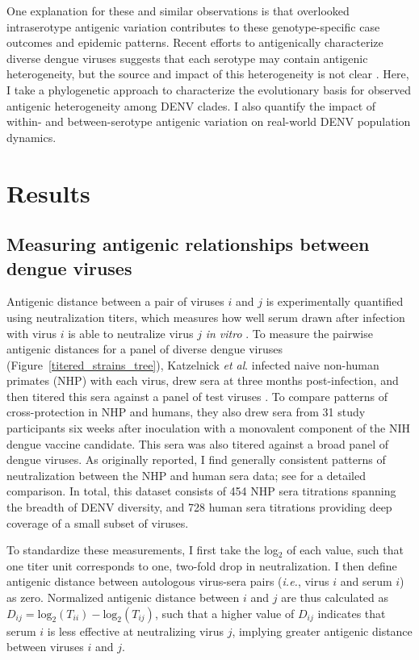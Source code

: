 One explanation for these and similar observations is that overlooked intraserotype antigenic variation contributes to these genotype-specific case outcomes and epidemic patterns.
Recent efforts to antigenically characterize diverse dengue viruses suggests that each serotype may contain antigenic heterogeneity, but the source and impact of this heterogeneity is not clear \citep{katzelnick2015dengue}.
Here, I take a phylogenetic approach to characterize the evolutionary basis for observed antigenic heterogeneity among DENV clades.
I also quantify the impact of within- and between-serotype antigenic variation on real-world DENV population dynamics.

\section{Results}
\subsection{Measuring antigenic relationships between dengue viruses}

Antigenic distance between a pair of viruses $i$ and $j$ is experimentally quantified using neutralization titers, which measures how well serum drawn after infection with virus $i$ is able to neutralize virus $j$ \textit{in vitro} \citep{russell1967dengue}.
To measure the pairwise antigenic distances for a panel of diverse dengue viruses (Figure~\ref{titered_strains_tree}), Katzelnick \textit{et al}. infected naive non-human primates (NHP) with each virus, drew sera at three months post-infection, and then titered this sera against a panel of test viruses \citep{katzelnick2015dengue}.
To compare patterns of cross-protection in NHP and humans, they also drew sera from 31 study participants six weeks after inoculation with a monovalent component of the NIH dengue vaccine candidate.
This sera was also titered against a broad panel of dengue viruses.
As originally reported, I find generally consistent patterns of neutralization between the NHP and human sera data; see \citep{katzelnick2015dengue} for a detailed comparison.
In total, this dataset consists of 454 NHP sera titrations spanning the breadth of DENV diversity, and 728 human sera titrations providing deep coverage of a small subset of viruses.

To standardize these measurements, I first take the log$_2$ of each value, such that one titer unit corresponds to one, two-fold drop in neutralization.
I then define antigenic distance between autologous virus-sera pairs (\textit{i.e.}, virus $i$ and serum $i$) as zero.
Normalized antigenic distance between $i$ and $j$ are thus calculated as $D_{ij} = \mathrm{log}_2(T_{ii}) - \mathrm{log}_2(T_{ij})$, such that a higher value of $D_{ij}$ indicates that serum $i$ is less effective at neutralizing virus $j$, implying greater antigenic distance between viruses $i$ and $j$.

